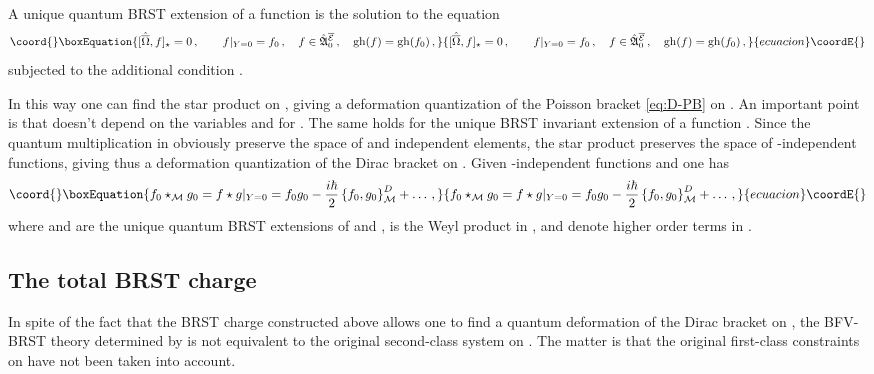 \documentclass[a4paper,11pt]{amsart}
\numberwithin{thm}{section} %
\numberwithin{equation}{section} %
\numberwithin{figure}{section} %
\providecommand{\qcommut}[2]{[#1,#2]_\star}
\providecommand{\pb}[2]{\left\{{}#1{},{}#2{}\right\}}
\providecommand{\gh}[1]{{\rm gh}(#1)}
\renewcommand{\:}{{\rm\, :\,}}
\def\bar{\overline}
\def\manM{{\mathcal M}}
\def\qA{{\hat{\mathfrak A}}}
\def\E{{ \mathcal E}}
\def\V{{\bf V}}
\begin{document}
A unique quantum BRST extension of a function \coordHE{} is the
solution to the equation
\begin{equation}\coord{}\boxEquation{
  \qcommut{{\hat{\bar\Omega}}}{f}=0\,, \qquad f|_{Y=0}=f_0\,,
 \quad f\in\qA^{\bar\E}_0\,,\quad \gh{f}=\gh{f_0}\,,
}{
  \qcommut{{\hat{\bar\Omega}}}{f}=0\,, \qquad f|_{Y=0}=f_0\,,
 \quad f\in\qA^{\bar\E}_0\,,\quad \gh{f}=\gh{f_0}\,,
}{ecuacion}\coordE{}\end{equation}
subjected to the additional condition \coordHE{}.

In this way one can find the star product \myHighlight{$\star_{\V(\manM)}$}\coordHE{} on
\myHighlight{$\V(\manM)$}\coordHE{}, giving a deformation quantization of the Poisson bracket
\eqref{eq:D-PB} on \myHighlight{$\V(\manM)$}\coordHE{}.  An important point is that
\myHighlight{${\hat{\bar\Omega}}^r$}\coordHE{} doesn't depend on the variables \myHighlight{$\eta^\alpha$}\coordHE{} and
\coordHE{} for \coordHE{}.  The same holds for the unique BRST
invariant extension of a function \coordHE{}.  Since the quantum
multiplication in \myHighlight{$\qA^{\bar\E}$}\coordHE{} obviously preserve the space of
\myHighlight{$\eta^\alpha$}\coordHE{} and \coordHE{} independent elements, the star product
\myHighlight{$\star_{\V(\manM)}$}\coordHE{} preserves the space of \myHighlight{$\eta$}\coordHE{}-independent
functions, giving thus a deformation quantization of the Dirac bracket on
\myHighlight{$\manM$}\coordHE{}. Given \myHighlight{$\eta$}\coordHE{}-independent functions \coordHE{} and \coordHE{} one
has
\begin{equation}\coord{}\boxEquation{
\label{eq:star-a}
  f_0\star_\manM g_0=f \star g |_{Y=0}=f_0
  g_0-\frac{i\hbar}{2}\pb{f_0}{g_0}^D_{\manM}+\ldots\,,
}{
f_0\star_\manM g_0=f \star g |_{Y=0}=f_0
  g_0-\frac{i\hbar}{2}\pb{f_0}{g_0}^D_{\manM}+\ldots\,,
}{ecuacion}\coordE{}\end{equation}
where \coordHE{} and \coordHE{} are the unique quantum BRST extensions of \coordHE{} and
\coordHE{}, \myHighlight{$\star$}\coordHE{} is the Weyl product in \myHighlight{$\qA^{\bar\E}_0$}\coordHE{}, and \myHighlight{$\ldots$}\coordHE{}
denote higher order terms in \myHighlight{$\hbar$}\coordHE{}.


\subsection{The total BRST charge}
In spite of the fact that the BRST charge \myHighlight{$\hat{\bar\Omega}$}\coordHE{}
constructed above allows one to find a quantum deformation of the Dirac
bracket on \myHighlight{$\manM$}\coordHE{}, the BFV-BRST theory determined by \myHighlight{$\hat{\bar\Omega}$}\coordHE{} is
not equivalent to the original second-class system on \myHighlight{$\manM$}\coordHE{}.
The matter is that the original first-class constraints \myHighlight{$\theta_\alpha$}\coordHE{} on
\myHighlight{$\V(\manM)$}\coordHE{} have not been taken into account.
\end{document}
